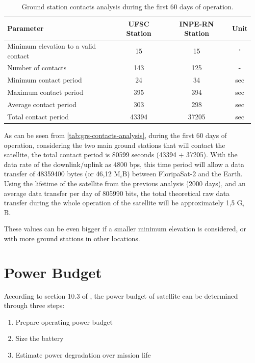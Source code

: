 \begin{table}[!h]
    \centering
    \begin{tabular}{lccc}
        \toprule[1.5pt]
        \textbf{Parameter} & \textbf{UFSC Station} & \textbf{INPE-RN Station} & \textbf{Unit} \\
        \midrule
        Minimum elevation to a valid contact    & 15    & 15    & $^{\circ}$ \\
        Number of contacts                      & 143   & 125   & - \\
        Minimum contact period                  & 24    & 34    & sec \\
        Maximum contact period                  & 395   & 394   & sec \\
        Average contact period                  & 303   & 298   & sec \\
        Total contact period                    & 43394 & 37205 & sec \\
        \bottomrule[1.5pt]
    \end{tabular}
    \caption{Ground station contacts analysis during the first 60 days of operation.}
    \label{tab:grs-contacts-analysis}
\end{table}

As can be seen from \autoref{tab:grs-contacts-analysis}, during the first 60 days of operation, considering the two main ground stations that will contact the satellite, the total contact period is 80599 seconds (43394 + 37205). With the data rate of the downlink/uplink as 4800 bps, this time period will allow a data transfer of 48359400 bytes (or 46,12 M$_{i}$B) between FloripaSat-2 and the Earth. Using the lifetime of the satellite from the previous analysis (2000 days), and an average data transfer per day of 805990 bits, the total theoretical raw data transfer during the whole operation of the satellite will be approximately 1,5 G$_{i}$B.

These values can be even bigger if a smaller minimum elevation is considered, or with more ground stations in other locations.

\section{Power Budget}

According to section 10.3 of \cite{larson2005}, the power budget of satellite can be determined through three steps:

\begin{enumerate}
    \item Prepare operating power budget
    \item Size the battery
    \item Estimate power degradation over mission life
\end{enumerate}


